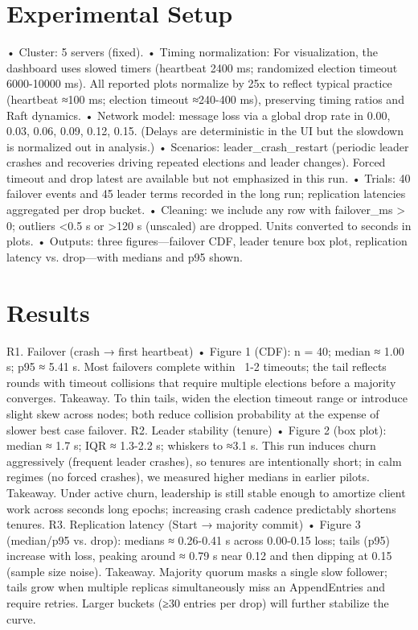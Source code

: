 \documentclass[11pt]{article}
\begin{document}
\section{Experimental Setup}
•	Cluster: 5 servers (fixed).
•	Timing normalization: For visualization, the dashboard uses slowed timers (heartbeat 2400 ms; randomized election timeout 6000-10000 ms). All reported plots normalize by 25x to reflect typical practice (heartbeat ≈100 ms; election timeout ≈240-400 ms), preserving timing ratios and Raft dynamics.
•	Network model: message loss via a global drop rate in {0.00, 0.03, 0.06, 0.09, 0.12, 0.15}. (Delays are deterministic in the UI but the slowdown is normalized out in analysis.)
•	Scenarios: leader_crash_restart (periodic leader crashes and recoveries driving repeated elections and leader changes). Forced timeout and drop latest are available but not emphasized in this run.
•	Trials: 40 failover events and 45 leader terms recorded in the long run; replication latencies aggregated per drop bucket.
•	Cleaning: we include any row with failover_ms > 0; outliers <0.5 s or >120 s (unscaled) are dropped. Units converted to seconds in plots.
•	Outputs: three figures—failover CDF, leader tenure box plot, replication latency vs. drop—with medians and p95 shown.

\section{Results}
R1. Failover (crash → first heartbeat)
•	Figure 1 (CDF): n = 40; median ≈ 1.00 s; p95 ≈ 5.41 s. Most failovers complete within ~1-2 timeouts; the tail reflects rounds with timeout collisions that require multiple elections before a majority converges.
Takeaway. To thin tails, widen the election timeout range or introduce slight skew across nodes; both reduce collision probability at the expense of slower best case failover.
R2. Leader stability (tenure)
•	Figure 2 (box plot): median ≈ 1.7 s; IQR ≈ 1.3-2.2 s; whiskers to ≈3.1 s. This run induces churn aggressively (frequent leader crashes), so tenures are intentionally short; in calm regimes (no forced crashes), we measured higher medians in earlier pilots.
Takeaway. Under active churn, leadership is still stable enough to amortize client work across seconds long epochs; increasing crash cadence predictably shortens tenures.
R3. Replication latency (Start → majority commit)
•	Figure 3 (median/p95 vs. drop): medians ≈ 0.26-0.41 s across 0.00-0.15 loss; tails (p95) increase with loss, peaking around ≈ 0.79 s near 0.12 and then dipping at 0.15 (sample size noise).
Takeaway. Majority quorum masks a single slow follower; tails grow when multiple replicas simultaneously miss an AppendEntries and require retries. Larger buckets (≥30 entries per drop) will further stabilize the curve.
\end{document}

